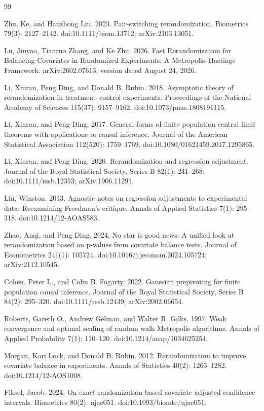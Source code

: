 \documentclass{article}
\begin{document}
\begin{thebibliography}{99}

   Zhu, Ke, and Hanzhong Liu. 2023. Pair-switching rerandomization. Biometrics 79(3): 2127--2142. doi:10.1111/biom.13712; arXiv:2103.13051.

   Lu, Jiuyao, Tianruo Zhang, and Ke Zhu. 2026. Fast Rerandomization for Balancing Covariates in Randomized Experiments: A Metropolis--Hastings Framework. arXiv:2602.07613, version dated August 24, 2026.

   Li, Xinran, Peng Ding, and Donald B. Rubin. 2018. Asymptotic theory of rerandomization in treatment--control experiments. Proceedings of the National Academy of Sciences 115(37): 9157--9162. doi:10.1073/pnas.1808191115.

   Li, Xinran, and Peng Ding. 2017. General forms of finite population central limit theorems with applications to causal inference. Journal of the American Statistical Association 112(520): 1759--1769. doi:10.1080/01621459.2017.1295865.

   Li, Xinran, and Peng Ding. 2020. Rerandomization and regression adjustment. Journal of the Royal Statistical Society, Series B 82(1): 241--268. doi:10.1111/rssb.12353; arXiv:1906.11291.

   Lin, Winston. 2013. Agnostic notes on regression adjustments to experimental data: Reexamining Freedman's critique. Annals of Applied Statistics 7(1): 295--318. doi:10.1214/12-AOAS583.

   Zhao, Anqi, and Peng Ding. 2024. No star is good news: A unified look at rerandomization based on p-values from covariate balance tests. Journal of Econometrics 241(1): 105724. doi:10.1016/j.jeconom.2024.105724; arXiv:2112.10545.

   Cohen, Peter L., and Colin B. Fogarty. 2022. Gaussian prepivoting for finite population causal inference. Journal of the Royal Statistical Society, Series B 84(2): 295--320. doi:10.1111/rssb.12439; arXiv:2002.06654.

   Roberts, Gareth O., Andrew Gelman, and Walter R. Gilks. 1997. Weak convergence and optimal scaling of random walk Metropolis algorithms. Annals of Applied Probability 7(1): 110--120. doi:10.1214/aoap/1034625254.

   Morgan, Kari Lock, and Donald B. Rubin. 2012. Rerandomization to improve covariate balance in experiments. Annals of Statistics 40(2): 1263--1282. doi:10.1214/12-AOS1008.

   Fiksel, Jacob. 2024. On exact randomization-based covariate-adjusted confidence intervals. Biometrics 80(2): ujae051. doi:10.1093/biomtc/ujae051.

\end{thebibliography}
\end{document}
